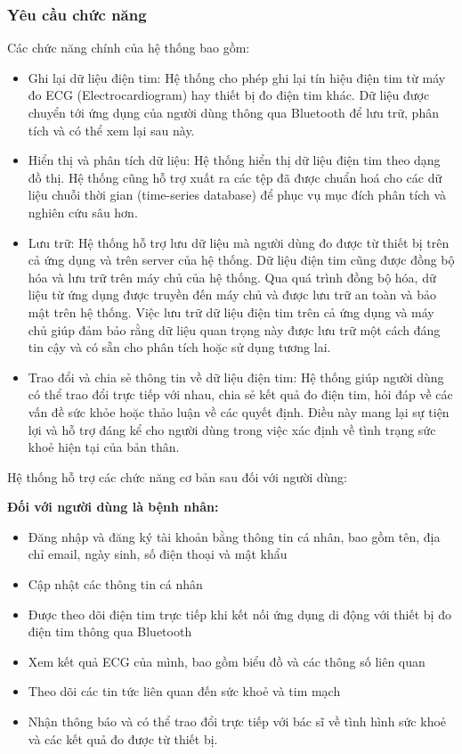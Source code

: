 \subsubsection{Yêu cầu chức năng}
Các chức năng chính của hệ thống bao gồm: 
\begin{adjustwidth}{2em}{}
  \begin{itemize}
      \item Ghi lại dữ liệu điện tim: Hệ thống cho phép ghi lại tín hiệu điện tim từ máy đo ECG (Electrocardiogram) hay thiết bị đo điện tim khác. Dữ liệu được chuyển tới ứng dụng của người dùng thông qua Bluetooth để lưu trữ, phân tích và có thể xem lại sau này.
  
      \item Hiển thị và phân tích dữ liệu: Hệ thống hiển thị dữ liệu điện tim theo dạng đồ thị. Hệ thống cũng hỗ trợ xuất ra các tệp đã được chuẩn hoá cho các dữ liệu chuỗi thời gian (time-series database) để phục vụ mục đích phân tích và nghiên cứu sâu hơn.
  
      \item Lưu trữ: Hệ thống hỗ trợ lưu dữ liệu mà người dùng đo được từ thiết bị trên cả ứng dụng và trên server của hệ thống. Dữ liệu điện tim cũng được đồng bộ hóa và lưu trữ trên máy chủ của hệ thống. Qua quá trình đồng bộ hóa, dữ liệu từ ứng dụng được truyền đến máy chủ và được lưu trữ an toàn và bảo mật trên hệ thống. Việc lưu trữ dữ liệu điện tim trên cả ứng dụng và máy chủ giúp đảm bảo rằng dữ liệu quan trọng này được lưu trữ một cách đáng tin cậy và có sẵn cho phân tích hoặc sử dụng tương lai.
  
      \item Trao đổi và chia sẻ thông tin về dữ liệu điện tim: Hệ thống giúp người dùng có thể trao đổi trực tiếp với nhau, chia sẻ kết quả đo điện tim, hỏi đáp về các vấn đề sức khỏe hoặc thảo luận về các quyết định. Điều này mang lại sự tiện lợi và hỗ trợ đáng kể cho người dùng trong việc xác định về tình trạng sức khoẻ hiện tại của bản thân.
  \end{itemize}
  \end{adjustwidth}
  
  

  
  
Hệ thống hỗ trợ các chức năng cơ bản sau đối với người dùng:

\textbf{Đối với người dùng là bệnh nhân:}
\begin{itemize}
    \item Đăng nhập và đăng ký tài khoản bằng thông tin cá nhân, bao gồm tên, địa chỉ email, ngày sinh, số điện thoại và mật khẩu
    \item Cập nhật các thông tin cá nhân
    \item Được theo dõi điện tim trực tiếp khi kết nối ứng dụng di động với thiết bị đo điện tim thông qua Bluetooth
    \item Xem kết quả ECG của mình, bao gồm biểu đồ và các thông số liên quan
    \item Theo dõi các tin tức liên quan đến sức khoẻ và tim mạch
    \item Nhận thông báo và có thể trao đổi trực tiếp với bác sĩ về tình hình sức khoẻ và các kết quả đo được từ thiết bị.
\end{itemize}

